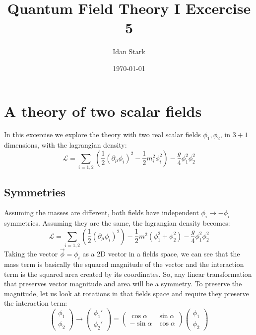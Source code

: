\documentclass{article}
\title{Quantum Field Theory I Excercise 5}
\author{Idan Stark}
\date{\today}
\begin{document}
\maketitle

\section{A theory of two scalar fields}
In this excercise we explore the theory with two real scalar fields $\phi_1, \phi_2$, in $3+1$ dimensions, with the lagrangian density:
\begin{equation}
    \mathcal{L} = \sum_{i=1,2}\left(
        \frac{1}{2}\left(\partial_\mu\phi_i\right)^2 - \frac{1}{2}m_i^2\phi_i^2
    \right) - \frac{g}{4}\phi_1^2\phi_2^2
\end{equation}
\subsection{Symmetries}
Assuming the masses are different, both fields have independent $\phi_i \rightarrow -\phi_i$ symmetries. Assuming they are the same, the lagrangian density becomes:
\begin{equation}
    \mathcal{L} = \sum_{i=1,2}\left(
        \frac{1}{2}\left(\partial_\mu\phi_i\right)^2
    \right) - \frac{1}{2}m^2(\phi_1^2 + \phi_2^2) - \frac{g}{4}\phi_1^2\phi_2^2
\end{equation}
Taking the vector $\vec{\phi} = \phi_i$ as a 2D vector in a fields space, we can see that the mass term is basically the squared magnitude of the vector and the interaction term is the squared area created by its coordinates. So, any linear transformation that preserves vector magnitude and area will be a symmetry. To preserve the magnitude, let us look at rotations in that fields space and require they preserve the interaction term:
\begin{equation}
    \begin{pmatrix}
        \phi_1 \\ \phi_2
    \end{pmatrix} \rightarrow
    \begin{pmatrix}
        \phi_1' \\ \phi_2'
    \end{pmatrix} = \begin{pmatrix}
        \cos \alpha & \sin \alpha \\ -\sin\alpha & \cos \alpha
    \end{pmatrix}
    \begin{pmatrix}
        \phi_1 \\ \phi_2
    \end{pmatrix}
\end{equation}
\end{document}
